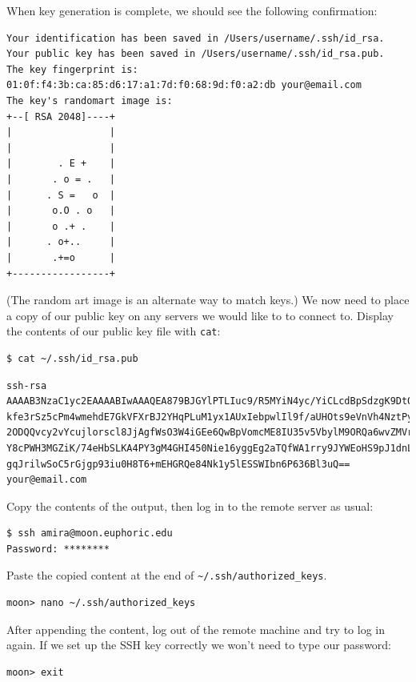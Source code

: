 \documentclass[
]{krantz}
\begin{document}
When key generation is complete,
we should see the following confirmation:

\begin{verbatim}
Your identification has been saved in /Users/username/.ssh/id_rsa.
Your public key has been saved in /Users/username/.ssh/id_rsa.pub.
The key fingerprint is:
01:0f:f4:3b:ca:85:d6:17:a1:7d:f0:68:9d:f0:a2:db your@email.com
The key's randomart image is:
+--[ RSA 2048]----+
|                 |
|                 |
|        . E +    |
|       . o = .   |
|      . S =   o  |
|       o.O . o   |
|       o .+ .    |
|      . o+..     |
|       .+=o      |
+-----------------+
\end{verbatim}

(The random art image is an alternate way to match keys.)
We now need to place a copy of our public key on
any servers we would like to to connect to.
Display the contents of our public key file with \texttt{cat}:

\begin{verbatim}
$ cat ~/.ssh/id_rsa.pub
\end{verbatim}

\begin{verbatim}
ssh-rsa AAAAB3NzaC1yc2EAAAABIwAAAQEA879BJGYlPTLIuc9/R5MYiN4yc/YiCLcdBpSdzgK9Dt0B
kfe3rSz5cPm4wmehdE7GkVFXrBJ2YHqPLuM1yx1AUxIebpwlIl9f/aUHOts9eVnVh4NztPy0iSU/Sv0b
2ODQQvcy2vYcujlorscl8JjAgfWsO3W4iGEe6QwBpVomcME8IU35v5VbylM9ORQa6wvZMVrPECBvwItT
Y8cPWH3MGZiK/74eHbSLKA4PY3gM4GHI450Nie16yggEg2aTQfWA1rry9JYWEoHS9pJ1dnLqZU3k/8OW
gqJrilwSoC5rGjgp93iu0H8T6+mEHGRQe84Nk1y5lESSWIbn6P636Bl3uQ== your@email.com
\end{verbatim}

Copy the contents of the output,
then log in to the remote server as usual:

\begin{verbatim}
$ ssh amira@moon.euphoric.edu
Password: ********
\end{verbatim}

Paste the copied content at the end of \texttt{\textasciitilde{}/.ssh/authorized\_keys}.

\begin{verbatim}
moon> nano ~/.ssh/authorized_keys
\end{verbatim}

After appending the content,
log out of the remote machine and try to log in again.
If we set up the SSH key correctly we won't need to type our password:

\begin{verbatim}
moon> exit
\end{verbatim}
\end{document}

